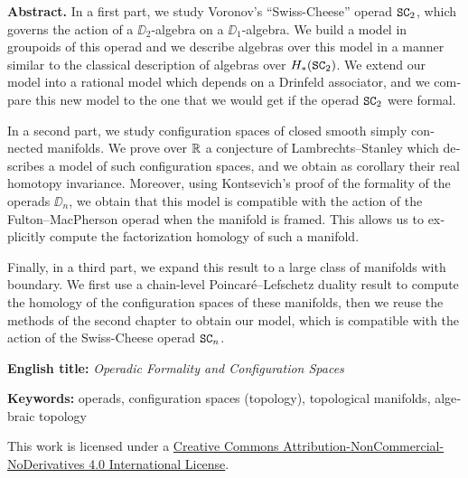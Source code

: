 \begin{english}
  \textbf{Abstract.}
  In a first part, we study Voronov's ``Swiss-Cheese'' operad $\mathtt{SC}_{2}$, which governs the action of a $\DD_{2}$-algebra on a $\DD_{1}$-algebra.
  We build a model in groupoids of this operad and we describe algebras over this model in a manner similar to the classical description of algebras over $H_{*}(\mathtt{SC}_{2})$.
  We extend our model into a rational model which depends on a Drinfeld associator, and we compare this new model to the one that we would get if the operad $\mathtt{SC}_{2}$ were formal.

  In a second part, we study configuration spaces of closed smooth simply connected manifolds.
  We prove over $\mathbb{R}$ a conjecture of Lambrechts--Stanley which describes a model of such configuration spaces, and we obtain as corollary their real homotopy invariance.
  Moreover, using Kontsevich's proof of the formality of the operads $\DD_{n}$, we obtain that this model is compatible with the action of the Fulton--MacPherson operad when the manifold is framed.
  This allows us to explicitly compute the factorization homology of such a manifold.

  Finally, in a third part, we expand this result to a large class of manifolds with boundary.
  We first use a chain-level Poincaré--Lefschetz duality result to compute the homology of the configuration spaces of these manifolds, then we reuse the methods of the second chapter to obtain our model, which is compatible with the action of the Swiss-Cheese operad $\mathtt{SC}_{n}$.

  \noindent \textbf{English title:} \emph{Operadic Formality and Configuration Spaces}

  \noindent \textbf{Keywords:} operads, configuration spaces (topology), topological manifolds, algebraic topology

  \noindent This work is licensed under a \href{https://creativecommons.org/licenses/by-nc-nd/4.0/}{Creative Commons Attribution-NonCommercial-NoDerivatives 4.0 International License}.
\end{english}
\endgroup

